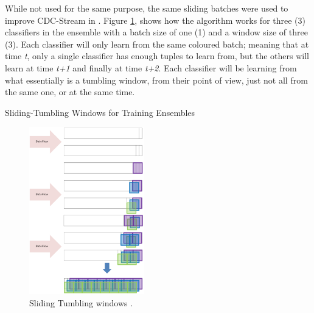 \documentclass[runningheads]{llncs}
\begin{document}
While not used for the same purpose, the same sliding batches were used to improve CDC-Stream in \citep{d2017context}. Figure \ref{fig:sliding_tumbling_windows}, shows how the algorithm works for three (3) classifiers in the ensemble with a batch size of one (1) and a window size of three (3). Each classifier will only learn from the same coloured batch; meaning that at time \textit{t}, only a single classifier has enough tuples to learn from, but the others will learn at time \textit{t+1} and finally at time \textit{t+2}. Each classifier will be learning from what essentially is a tumbling window, from their point of view, just not all from the same one, or at the same time. 


\begin{algorithm}
\caption{Sliding-Tumbling Windows for Training Ensembles\label{alg:sliding_tumbling_windows} }
\end{algorithm}


\begin{figure}
\begin{center}
 \includegraphics[width=5cm]{./images/chapter3/sliding_tumbling_windows}
 \caption{Sliding Tumbling windows \citep{d2017context}.}
 \label{fig:sliding_tumbling_windows}
 \end{center}
\end{figure}
\end{document}
